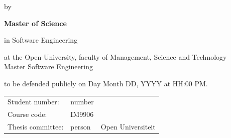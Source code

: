 \begin{titlepage}

\begin{center}


\vspace*{2\bigskipamount}

{\makeatletter
\titlestyle\color{red}\Huge\@title
\makeatother}

{\makeatletter
\ifx\@subtitle\undefined\else
    \bigskip
    \titlefont\titleshape\LARGE\@subtitle
\fi
\makeatother}

\bigskip
\bigskip

by

\bigskip
\bigskip

{\makeatletter
\titlefont\Large\bfseries\@author
\makeatother}

\vfill


\bigskip
\bigskip

{\bfseries Master of Science}

in Software Engineering

\bigskip
\bigskip

at the Open University, faculty of Management, Science and Technology \\
Master Software Engineering

to be defended publicly on Day Month DD, YYYY at HH:00 PM.

\vfill

\begin{tabular}{lll}
    Student number: & number \\
    Course code: & \textsc{IM}9906\\
    Thesis committee:
        & person & Open Universiteit \\
\end{tabular}

\bigskip


\bigskip

\end{center}

\end{titlepage} 
